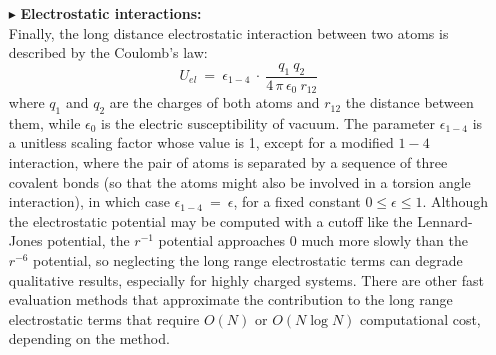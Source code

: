 \begin{itemize}
\item[$\blacktriangleright$] \textbf{Electrostatic interactions:}\\
Finally, the long distance electrostatic interaction between two atoms is described by the Coulomb's law:
\begin{equation}\label{eq:Coulomb_potential}
U_{el} \: = \: \epsilon_{1-4} \: \cdot \: \frac{q_1 \: q_2}{4 \, \pi \, \epsilon_0 \: r_{12}}
\end{equation}
where $q_1$ and $q_2$ are the charges of both atoms and $r_{12}$ the distance between them, while $\epsilon_0$ is the electric susceptibility of vacuum.
The parameter $\epsilon_{1-4}$ is a unitless scaling factor whose value is 1, except for a modified $1-4$ interaction, where the pair of atoms is separated by a sequence of three covalent bonds (so that the atoms might also be involved in a torsion angle interaction), in which case $\epsilon_{1-4} \:=\: \epsilon$, for a fixed constant $0 \leq \epsilon \leq 1$. 
Although the electrostatic potential may be computed with a cutoff like the Lennard-Jones potential, the $r^{-1}$ potential approaches 0 much more slowly than the $r^{-6}$ potential, so neglecting the long range electrostatic terms can degrade qualitative results, especially for highly charged systems. There are other fast evaluation methods that approximate the contribution to the long range electrostatic terms that require $O(N)$ or $O(N \log N)$ computational cost, depending on the method.
\end{itemize}

\vspace{0.25cm}

